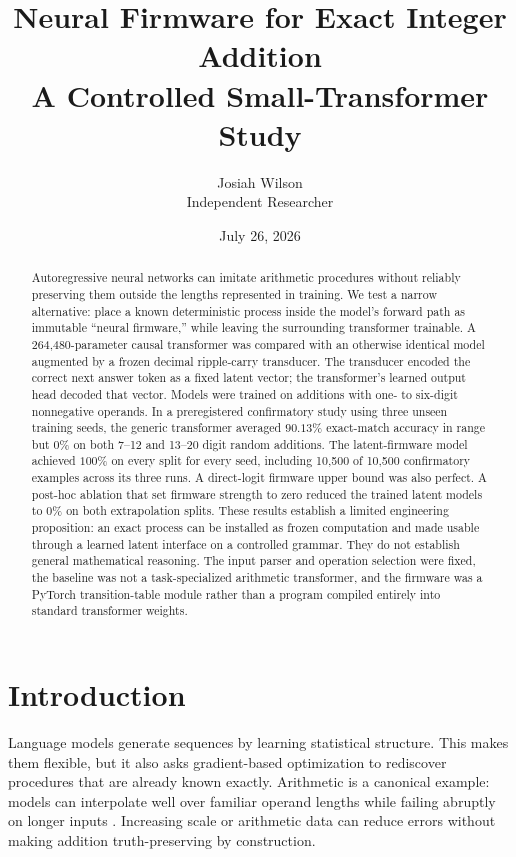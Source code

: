 \documentclass[11pt]{article}
\title{\textbf{Neural Firmware for Exact Integer Addition}\\
\large A Controlled Small-Transformer Study}
\author{Josiah Wilson\\Independent Researcher}
\date{July 26, 2026}
\begin{document}
\maketitle

\begin{abstract}
Autoregressive neural networks can imitate arithmetic procedures without
reliably preserving them outside the lengths represented in training. We test
a narrow alternative: place a known deterministic process inside the model's
forward path as immutable ``neural firmware,'' while leaving the surrounding
transformer trainable. A 264{,}480-parameter causal transformer was compared
with an otherwise identical model augmented by a frozen decimal ripple-carry
transducer. The transducer encoded the correct next answer token as a fixed
latent vector; the transformer's learned output head decoded that vector.
Models were trained on additions with one- to six-digit nonnegative operands.
In a preregistered confirmatory study using three unseen training seeds, the
generic transformer averaged \(90.13\%\) exact-match accuracy in range but
\(0\%\) on both 7--12 and 13--20 digit random additions. The latent-firmware
model achieved \(100\%\) on every split for every seed, including 10{,}500 of
10{,}500 confirmatory examples across its three runs. A direct-logit firmware
upper bound was also perfect. A post-hoc ablation that set firmware strength to
zero reduced the trained latent models to \(0\%\) on both extrapolation splits.
These results establish a limited engineering proposition: an exact process
can be installed as frozen computation and made usable through a learned
latent interface on a controlled grammar. They do not establish general
mathematical reasoning. The input parser and operation selection were fixed,
the baseline was not a task-specialized arithmetic transformer, and the
firmware was a PyTorch transition-table module rather than a program compiled
entirely into standard transformer weights.
\end{abstract}

\section{Introduction}

Language models generate sequences by learning statistical structure. This
makes them flexible, but it also asks gradient-based optimization to rediscover
procedures that are already known exactly. Arithmetic is a canonical example:
models can interpolate well over familiar operand lengths while failing
abruptly on longer inputs \cite{brown2020language,jelassi2023length}. Increasing
scale or arithmetic data can reduce errors without making addition
truth-preserving by construction.
\end{document}
